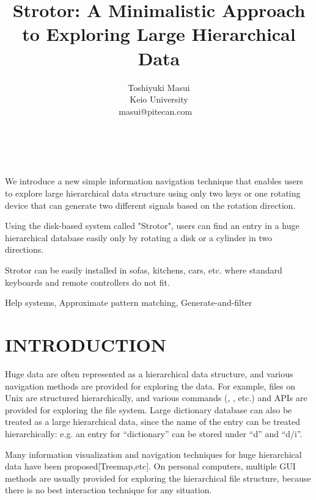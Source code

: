 \documentclass{article}
\begin{document}
\title{Strotor: A Minimalistic Approach to Exploring Large Hierarchical Data}
\author{
\begin{tabular}{l}
\parbox{5.5cm}{
\begin{center}
Toshiyuki Masui\\
Keio University\\
masui@pitecan.com
~ \\
~ \\
~
\end{center}
}
\end{tabular}
}
\maketitle
\abstract
We introduce a new simple information navigation technique
that enables users to explore large hierarchical data structure
using only two keys or one rotating device that can generate
two different signals based on the rotation direction.

Using the disk-based system called "Strotor",
users can find an entry in a huge hierarchical database easily
only by rotating a disk or a cylinder in two directions.

Strotor can be easily installed in sofas, kitchens, cars, etc.
where standard keyboards and remote controllers do not fit.

\keywords Help systems, Approximate pattern matching, Generate-and-filter


\section*{INTRODUCTION}

Huge data are often represented as a hierarchical data structure, and
various navigation methods are provided for exploring the data.
For example, files on Unix are structured hierarchically, and
various commands (, , etc.) and APIs are provided for exploring the file system.
Large dictionary database can also be treated as a large
hierarchical data, since the name of the entry can be treated hierarchically:
e.g. an entry for ``dictionary'' can be stored under ``d'' and ``d/i''.

Many information visualization and navigation techniques for huge hierarchical data
have been proposed[Treemap,etc].
On personal computers,
multiple GUI methods are usually provided for
exploring the hierarchical file structure, because
there is no best interaction technique for any situation.
\end{document}
